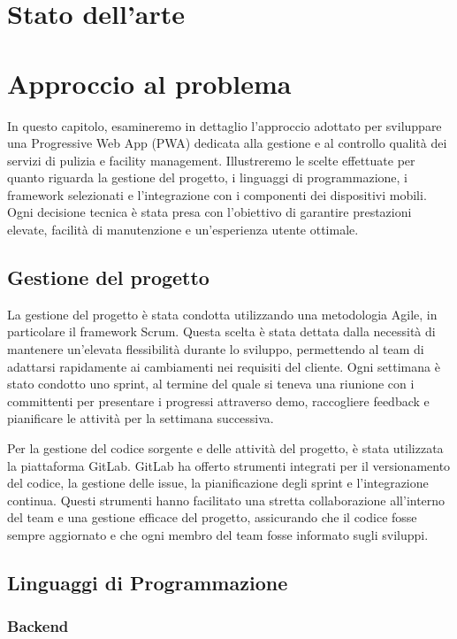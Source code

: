 \documentclass[twoside]{supsistudent}
\begin{document}
\chapter{Stato dell'arte}


\chapter{Approccio al problema}
In questo capitolo, esamineremo in dettaglio l'approccio adottato per sviluppare una Progressive Web App (PWA) dedicata alla gestione e al controllo qualità dei servizi di pulizia e facility management. Illustreremo le scelte effettuate per quanto riguarda la gestione del progetto, i linguaggi di programmazione, i framework selezionati e l'integrazione con i componenti dei dispositivi mobili. Ogni decisione tecnica è stata presa con l'obiettivo di garantire prestazioni elevate, facilità di manutenzione e un'esperienza utente ottimale.

\section{Gestione del progetto}

La gestione del progetto è stata condotta utilizzando una metodologia Agile, in particolare il framework Scrum. Questa scelta è stata dettata dalla necessità di mantenere un'elevata flessibilità durante lo sviluppo, permettendo al team di adattarsi rapidamente ai cambiamenti nei requisiti del cliente. Ogni settimana è stato condotto uno sprint, al termine del quale si teneva una riunione con i committenti per presentare i progressi attraverso demo, raccogliere feedback e pianificare le attività per la settimana successiva.

Per la gestione del codice sorgente e delle attività del progetto, è stata utilizzata la piattaforma GitLab. GitLab ha offerto strumenti integrati per il versionamento del codice, la gestione delle issue, la pianificazione degli sprint e l'integrazione continua. Questi strumenti hanno facilitato una stretta collaborazione all'interno del team e una gestione efficace del progetto, assicurando che il codice fosse sempre aggiornato e che ogni membro del team fosse informato sugli sviluppi.

\section{Linguaggi di Programmazione}

\subsection{Backend}
\end{document}

